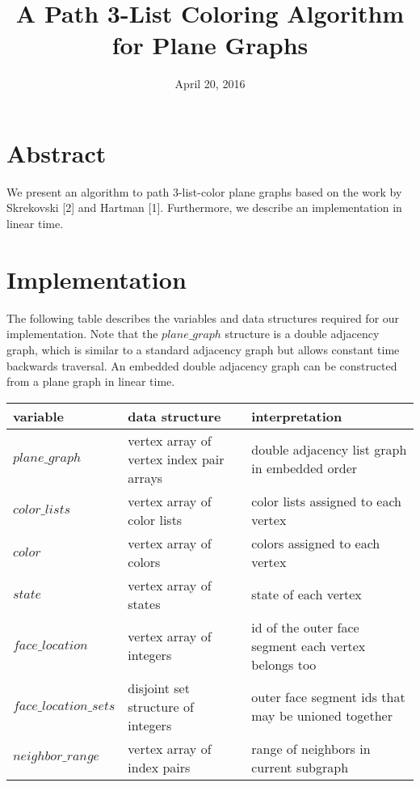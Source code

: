\documentclass[10pt,letter]{article}
\begin{document}
\title{A Path 3-List Coloring Algorithm for Plane Graphs}
\date{April 20, 2016}

\maketitle

\section*{Abstract}

We present an algorithm to path $3$-list-color plane graphs based on the work by Skrekovski [2]
and Hartman [1]. Furthermore, we describe an implementation in linear time.

\section*{Implementation}

The following table describes the variables and data structures required for our implementation. Note that the $plane\_graph$
structure is a double adjacency graph, which is similar to a standard adjacency graph but allows constant time
backwards traversal. An embedded double adjacency graph can be constructed from
a plane graph in linear time.\\

\begin{tabular}{p{3.5cm}|p{4.5cm}|p{5.5cm}}
\textbf{variable} & \textbf{data structure} & \textbf{interpretation}\\
\hline
$plane\_graph$ & vertex array of vertex index pair arrays & double adjacency list graph in embedded order\\
\hline
$color\_lists$ & vertex array of color lists & color lists assigned to each vertex\\
\hline
$color$ & vertex array of colors & colors assigned to each vertex\\
\hline
$state$ & vertex array of states & state of each vertex\\
\hline
$face\_location$ & vertex array of integers & id of the outer face segment each vertex belongs too\\
\hline
$face\_location\_sets$ & disjoint set structure of integers & outer face segment ids that may be unioned together\\
\hline
$neighbor\_range$ & vertex array of index pairs & range of neighbors in current subgraph
\end{tabular}\\
\end{document}
